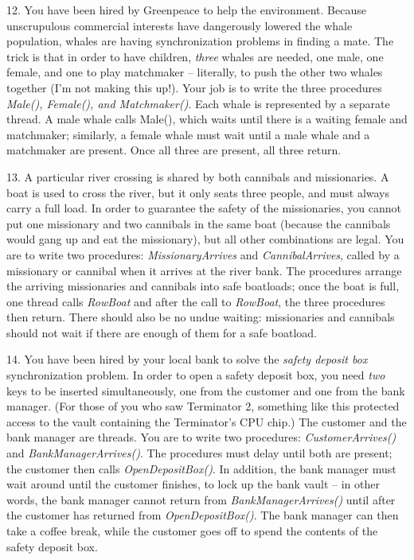 \begin{description}
\item{12.} You have been hired by Greenpeace to help the environment.
Because unscrupulous commercial interests have dangerously lowered
the whale population, whales are having synchronization problems
in finding a mate.  The trick is that in order to have children,
{\em three} whales are needed, one male, one female, and one to
play matchmaker -- literally, to push the other two whales together
(I'm not making this up!).
Your job is to write the three procedures {\em Male(), Female(), and
Matchmaker()}.  Each whale is represented by a separate thread.
A male whale calls Male(), which waits until there is a waiting female
and matchmaker; similarly, a female whale must wait until a male whale
and a matchmaker are present.  Once all three are present, all three return.

\item{13.}  
A particular river crossing is shared by both
cannibals and missionaries.  A boat is used to cross the river, but
it only seats three people, and must always carry a full load.  In
order to guarantee the safety of the missionaries, you cannot put
one missionary and two cannibals in the same boat (because the cannibals would
gang up and eat the missionary), but all other combinations are legal.
You are to write two procedures: {\em MissionaryArrives} and 
{\em CannibalArrives},
called by a missionary or cannibal when it arrives at the river bank.
The procedures arrange the arriving missionaries and cannibals into
safe boatloads; once the boat is full, one thread calls {\em RowBoat}
and after the call to {\em RowBoat}, the three procedures then return.
There should also be no undue waiting:
missionaries and cannibals should not wait if there are enough of them
for a safe boatload.

\item{14.}
You have been hired by your local bank to solve the {\em safety deposit box}
synchronization problem.  In order to open a safety deposit box,
you need {\em two} keys to be inserted simultaneously, one from
the customer and one from the bank manager.  (For those of you who
saw Terminator 2, something like this protected access to the
vault containing the Terminator's CPU chip.)  The customer and the
bank manager are threads.   You are to write two procedures:
{\em CustomerArrives()} and {\em BankManagerArrives()}.
The procedures must delay until both are present; the customer
then calls {\em OpenDepositBox()}.   In addition, the bank manager
must wait around until the customer finishes, to lock up the bank vault --
in other words, the bank manager cannot return from {\em BankManagerArrives()}
until after the customer has returned from {\em OpenDepositBox()}.
The bank manager can then take a coffee break, while the customer goes off to
spend the contents of the safety deposit box.

\end{description}


